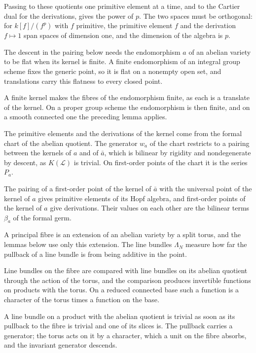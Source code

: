Passing to these quotients one primitive element at a time, and to the Cartier dual for the derivations,
gives the power of $p$. The two spaces must be orthogonal: for $k[f]/(f^p)$ with $f$ primitive, the
primitive element $f$ and the derivation $f\mapsto1$ span spaces of dimension one, and the dimension of the
algebra is $p$.

The descent in the pairing below needs the endomorphism $a$ of an abelian variety to be flat when its
kernel is finite. A finite endomorphism of an integral group scheme fixes the generic point, so it is flat
on a nonempty open set, and translations carry this flatness to every closed point.

A finite kernel makes the fibres of the endomorphism finite, as each is a translate of the kernel. On a
proper group scheme the endomorphism is then finite, and on a smooth connected one the preceding lemma
applies.

The primitive elements and the derivations of the kernel come from the formal chart of the abelian
quotient. The generator $w_a$ of the chart restricts to a pairing between the kernels of $a$ and of
$\bar a$, which is bilinear by rigidity and nondegenerate by descent, as $K(\mathcal L)$ is trivial. On
first-order points of the chart it is the series $P_a$.

The pairing of a first-order point of the kernel of $\bar a$ with the universal point of the kernel of $a$
gives primitive elements of its Hopf algebra, and first-order points of the kernel of $a$ give
derivations. Their values on each other are the bilinear terms $\beta_a$ of the formal germ.

A principal fibre is an extension of an abelian variety by a split torus, and the lemmas below use only
this extension. The line bundles $\Lambda_N$ measure how far the pullback of a line bundle is from being
additive in the point.

Line bundles on the fibre are compared with line bundles on its abelian quotient through the action of the
torus, and the comparison produces invertible functions on products with the torus. On a reduced connected
base such a function is a character of the torus times a function on the base.

A line bundle on a product with the abelian quotient is trivial as soon as its pullback to the fibre is
trivial and one of its slices is. The pullback carries a generator; the torus acts on it by a character,
which a unit on the fibre absorbs, and the invariant generator descends.

